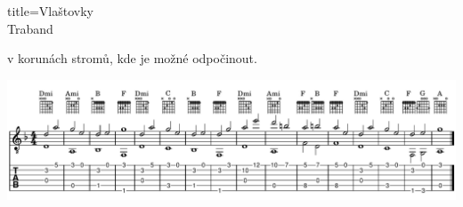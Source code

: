 \begin{song}{title=\predtitle\centering Vlaštovky \\\large Traband  \vspace*{-0.3cm}}
\begin{centerjustified}
	v korunách stromů, kde je možné odpočinout.

\end{centerjustified}

\centering
\includegraphics[scale=\defaulttabscale]{../taby/vlastovky-noty.pdf}

\setcounter{Slokočet}{0}
\end{song}
